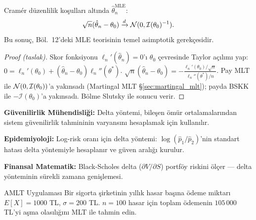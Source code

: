 \begin{teorem}\label{thm:mle_asimptotik}
Cramér düzenlilik koşulları altında $\hat\theta_n^{\mathrm{MLE}}$:
\[
  \sqrt{n}(\hat\theta_n-\theta_0)\xrightarrow{d}\mathcal{N}(0,\mathcal{I}(\theta_0)^{-1}).
\]
Bu sonuç, Böl.~12'deki MLE teorisinin temel asimptotik gerekçesidir.
\end{teorem}

\begin{proof}[Proof (taslak)]
Skor fonksiyonu $\ell_n'(\hat\theta_n)=0$'ı $\theta_0$ çevresinde Taylor açılımı yap:
$0=\ell_n'(\theta_0)+(\hat\theta_n-\theta_0)\ell_n''(\theta^*)$.
$\sqrt{n}(\hat\theta_n-\theta_0)=-\frac{\ell_n'(\theta_0)/\sqrt{n}}{\ell_n''(\theta^*)/n}$.
Pay MLT ile $\mathcal{N}(0,\mathcal{I}(\theta_0))$'a yakınsadı (Martingal MLT §\ref{sec:martingal_mlt}); payda BSKK ile $-\mathcal{I}(\theta_0)$'a yakınsadı. Bölme Slutsky ile sonucu verir.
\end{proof}

\begin{disiplinlerarasibaglan}
\textbf{Güvenilirlik Mühendisliği:} Delta yöntemi, bileşen ömür ortalamalarından sistem güvenilirlik tahmininin varyansını hesaplamak için kullanılır.

\textbf{Epidemiyoloji:} Log-risk oranı için delta yöntemi: $\log(\hat p_1/\hat p_2)$'nin standart hatası delta yöntemiyle hesaplanır ve güven aralığı kurulur.

\textbf{Finansal Matematik:} Black-Scholes delta ($\partial V/\partial S$) portföy riskini ölçer --- delta yönteminin sürekli zamana genişlemesi.
\end{disiplinlerarasibaglan}


\cozumlualistirmalar

\begin{alistirma}[Al.8.1]{A}{MLT Uygulaması}
Bir sigorta şirketinin yıllık hasar başına ödeme miktarı $E[X] = 1000$ TL,
$\sigma = 200$ TL. $n = 100$ hasar için toplam ödemenin $105\,000$ TL'yi aşma
olasılığını MLT ile tahmin edin.
\end{alistirma}

